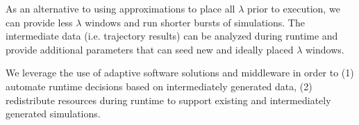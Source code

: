 As an alternative to using approximations to place all $\lambda$ prior to 
execution, we can provide less $\lambda$ windows and run shorter bursts of 
simulations. The intermediate data (i.e. trajectory results) can be analyzed 
during runtime and provide additional parameters that can seed new and ideally 
placed $\lambda$ windows. 

We leverage the use of adaptive software solutions and middleware in
order to (1) automate runtime decisions based on intermediately 
generated data, (2) redistribute resources during runtime to support existing  
and intermediately generated simulations. 






